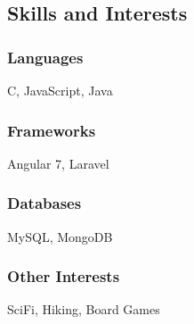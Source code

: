 \documentclass[12pt]{res} %
\begin{document}
\begin{resume}
        \section{Skills and Interests}
          \vspace{3pt}

          \begin{multicols}{4}

            \subsubsection{Languages}
            \vspace{-22pt}
            C, JavaScript, Java
            \vspace{-28pt}

            \subsubsection{Frameworks}
            \vspace{-22pt}
            Angular 7, Laravel
            \vspace{-28pt}

            \subsubsection{Databases}
            \vspace{-22pt}
            MySQL, MongoDB
            \vspace{-28pt}

            \subsubsection{Other Interests}
            \vspace{-22pt}
            SciFi, Hiking, Board Games

            \vspace{-12pt}

          \end{multicols}
        \vspace{-24pt}


\end{resume}
\end{document}
